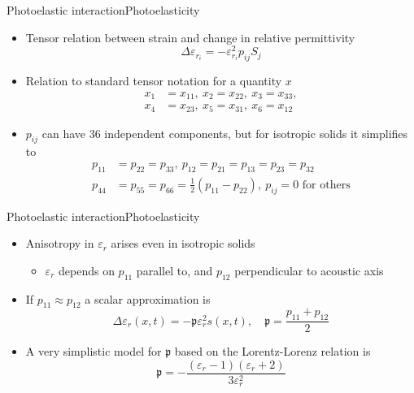 \documentclass[11pt]{beamer}
\begin{document}
	\begin{frame}{Photoelastic interaction}{Photoelasticity}
		\begin{itemize}
			\item Tensor relation between strain and change in relative permittivity
			\begin{equation*}
				\Delta \varepsilon_{r_i} = -\varepsilon_{r_i}^2 p_{ij} S_j
			\end{equation*}
			\item Relation to standard tensor notation for a quantity $x$
			\begin{align*}
				x_1 &= x_{11},\ x_2 = x_{22},\ x_3 = x_{33}, \\
				x_4 &= x_{23},\ x_5 = x_{31},\ x_6 = x_{12}
			\end{align*}
			\item $p_{ij}$ can have 36 independent components, but for isotropic solids it simplifies to
			\begin{align*}
				p_{11} &= p_{22} = p_{33}, \ p_{12} = p_{21} = p_{13} = p_{23} = p_{32}\\
				p_{44} &= p_{55} = p_{66} = \frac{1}{2} (p_{11} - p_{22}), \ p_{ij} = 0 \text{ for others}
			\end{align*}
		\end{itemize}
	\end{frame}
	
	\begin{frame}{Photoelastic interaction}{Photoelasticity}
		\begin{itemize}
			\item Anisotropy in $\varepsilon_r$ arises even in isotropic solids
			\begin{itemize}
				\item $\varepsilon_r$ depends on $p_{11}$ parallel to, and $p_{12}$ perpendicular to acoustic axis
			\end{itemize}
			\item If  $p_{11} \approx p_{12}$ a scalar approximation is
			\begin{equation*}
				\Delta \varepsilon_r(x,t) = -\mathfrak{p} \varepsilon_r^2 s(x,t), \quad \mathfrak{p} = \frac{p_{11} + p_{12}}{2}
			\end{equation*}
			\item A very simplistic model for $\mathfrak{p}$ based on the Lorentz-Lorenz relation is
			\begin{equation*}
				\mathfrak{p} = -\frac{(\varepsilon_r - 1)(\varepsilon_r + 2)}{3\varepsilon_r^2}
			\end{equation*}
		\end{itemize}
	\end{frame}
		
\end{document}
